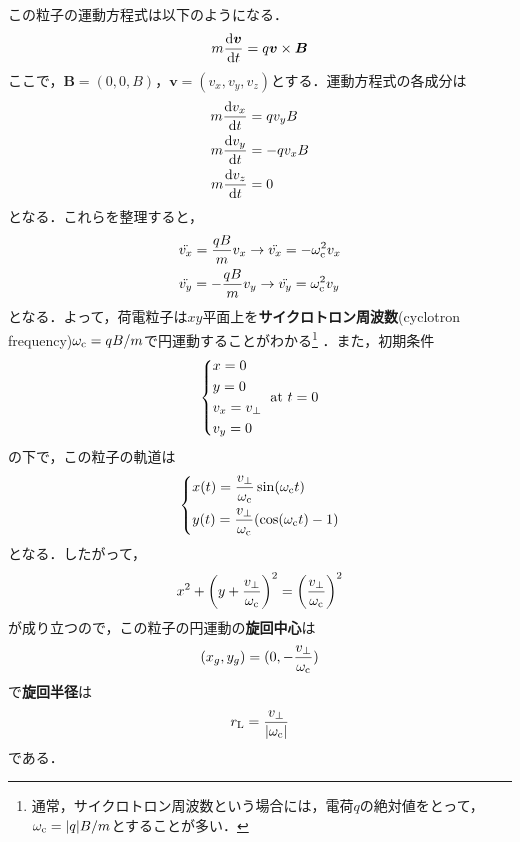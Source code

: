 \documentclass{report}
\begin{document}
      この粒子の運動方程式は以下のようになる．
      \begin{align}
        m \dv{\bm{v}}{t} = q\bm{v}\times\bm{B}
      \end{align}
      ここで，$\bm{B} = (0,0,B)$，$\bm{v} = (v_x,v_y,v_z)$とする．運動方程式の各成分は
      \begin{align}
        m\dv{v_x}{t} &= qv_yB\\
        m\dv{v_y}{t} &= -qv_xB\\
        m\dv{v_z}{t} &= 0
      \end{align}
      となる．これらを整理すると，
      \begin{align}
        &\ddot{v_x} = \frac{qB}{m}v_x \to \ddot{v_x} = - \omega_{\mathrm{c}}^2 v_x\\
        &\ddot{v_y} = -\frac{qB}{m}v_y \to \ddot{v_y} = \omega_{\mathrm{c}}^2 v_y
      \end{align}
      となる．よって，荷電粒子は$xy$平面上を\textbf{サイクロトロン周波数}(cyclotron frequency)$\omega_{\mathrm{c}}=qB/m$で円運動することがわかる\footnote{
        通常，サイクロトロン周波数という場合には，電荷$q$の絶対値をとって，$\omega_{\mathrm{c}} = |q|B/m$とすることが多い．
      }
      ．また，初期条件
      \begin{align}
        \begin{dcases}
          x = 0\\
          y = 0\\
          v_x = v_{\perp}\\
          v_y = 0
        \end{dcases}
        \ \mathrm{at}\ t = 0
      \end{align}
      の下で，この粒子の軌道は
      \begin{align}
        \begin{dcases}
          x(t) = \frac{v_{\perp}}{\omega_{\mathrm{c}}}\sin(\omega_{\mathrm{c}}t)\\
          y(t) = \frac{v_{\perp}}{\omega_{\mathrm{c}}}(\cos(\omega_{\mathrm{c}}t)-1)
        \end{dcases}
      \end{align}
      となる．したがって，
      \begin{align}
        x^2 + \qty(y + \frac{v_{\perp}}{\omega_{\mathrm{c}}})^2 = \qty(\frac{v_{\perp}}{\omega_{\mathrm{c}}})^2
      \end{align}
      が成り立つので，この粒子の円運動の\textbf{旋回中心}は
      \begin{align}
        (x_g,y_g) = (0, -\frac{v_{\perp}}{\omega_{\mathrm{c}}})
      \end{align}
      で\textbf{旋回半径}は
      \begin{align}
        r_{\mathrm{L}} = \frac{v_{\perp}}{\abs{\omega_{\mathrm{c}}}}
      \end{align}
      である．
\end{document}
